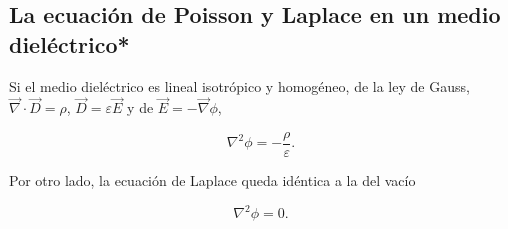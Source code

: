 \subsection{La ecuación de Poisson y Laplace en un medio dieléctrico*}

Si el medio dieléctrico es lineal isotrópico y homogéneo, de la ley de Gauss, $\Vec{\nabla} \cdot \Vec{D} = \rho$, $\Vec{D} = \varepsilon \Vec{E}$ y de $\Vec{E} = - \Vec{\nabla} \phi$, 
\begin{shaded}
    $$\nabla^2 \phi = -\frac{\rho}{\varepsilon}.$$
\end{shaded}

Por otro lado, la ecuación de Laplace queda idéntica a la del vacío 
\begin{shaded}
    $$\nabla^2 \phi = 0.$$
\end{shaded}

